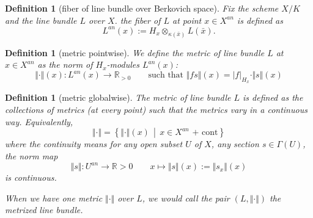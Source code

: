 \documentclass[reqno,11pt]{amsart}
\numberwithin{equation}{section}
\theoremstyle{plain}
\newtheorem{defn}[theorem]{Definition}
\theoremstyle{plain}
\numberwithin{equation}{section}
\theoremstyle{remark}
\newcommand{\norm}[1]{\Vert{#1}\Vert}
\begin{document}
\begin{defn}[fiber of line bundle over Berkovich space]
Fix the scheme $X/K$ and the line bundle $L$ over $X$. the fiber of $L$ at point $x \in X^{an}$ is defined as
$$L^{an}(x):= H_x \otimes_{\kappa(\bar{x}) }L(\bar{x}).$$

\end{defn}
\begin{center}

\end{center}
\begin{defn}[metric pointwise]
We define the metric of line bundle $L$ at $x \in X^{an}$ as the norm of $H_x$-modules $L^{an}(x)$:
$$\norm{\cdot}(x):L^{an}(x) \longrightarrow \mathbb{R}_{>0} \qquad \text{such that }\norm{fs}(x)=|f|_{H_x} \cdot\norm{s}(x) $$
\end{defn}
\begin{defn}[metric globalwise]
The metric of line bundle $L$ is defined as the collections of metrics (at every point) such that the metrics vary in a continuous way. Equivalently,
$$\norm{\cdot}=\left\{ \norm{\cdot}(x)\, \middle|\, x\in X^{an} \text{ + cont} \right\}$$
where the continuity means for any open subset $U$ of $X$, any section $s \in \Gamma(U)$, the norm map
$$\norm{s}: U^{an} \longrightarrow \mathbb{R}>0 \qquad x \longmapsto \norm{s}(x):=\norm{s_x}(x)$$
is continuous.

When we have one metric $\norm{\cdot}$ over $L$, we would call the pair $(L,\norm{\cdot})$ the metrized line bundle.
\end{defn}
\end{document}
